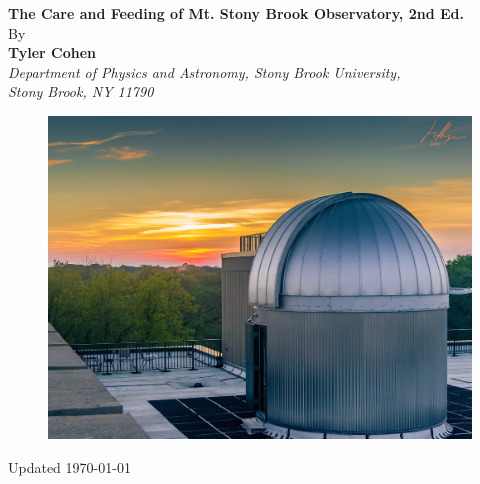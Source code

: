 \documentclass[12pt,titlepage]{article}
\begin{document}

\begin{titlepage}
\begin{minipage}{1in}
\begin{tabular}{l}
\end{tabular}
\end{minipage}
\hfill
\begin{minipage}{1in}
\begin{tabular}{r}
\end{tabular}
\end{minipage}

\begin{center}

{\huge\textbf{{The Care and Feeding of Mt. Stony Brook Observatory, 2nd Ed.} }}\\[0.4cm]

\vspace{1cm}
By\\
\large\textbf{Tyler Cohen}\\
\textit{Department of Physics and Astronomy, Stony Brook University,
    \\Stony Brook, NY 11790}
\end{center}
\vspace{1cm}
\begin{figure}[H] 
	\begin{center}
		\includegraphics[width=\textwidth]{./images/cover/MtStonyBrookSunset_crop.jpg} 
	\end{center}
\end{figure}
\vspace*{\fill}
\enlargethispage{2.5\baselineskip}
\begin{center}
	Updated \today
\end{center}

\end{titlepage}
\end{document}
